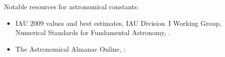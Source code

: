 \bigskip

\noindent Notable resources for astronomical constants:
\begin{itemize}
	\item IAU 2009 values and best estimates, IAU Division~I Working Group, Numerical Standards for Fundamental Astronomy, \citet{Luzum2011}.
	
	\item The Astronomical Almanac Online, \citet{USNAO2017}:\\
	
\end{itemize}


